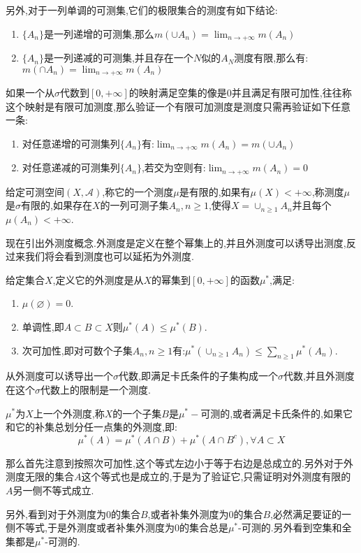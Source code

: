 另外,对于一列单调的可测集,它们的极限集合的测度有如下结论:
\begin{enumerate}
  \item $\{A_n\}$是一列递增的可测集,那么$m(\cup A_n)=\lim_{n\to +\infty}m(A_n)$
  \item $\{A_n\}$是一列递减的可测集,并且存在一个$N$似的$A_N$测度有限,那么有:
  $m(\cap A_n)=\lim_{n\to+\infty}m(A_n)$
\end{enumerate}

如果一个从$\sigma$代数到$[0,+\infty]$的映射满足空集的像是0并且满足有限可加性,往往称这个映射是有限可加测度,那么验证一个有限可加测度是测度只需再验证如下任意一条:
\begin{enumerate}
  \item 对任意递增的可测集列$\{A_n\}$有:$\lim_ {n\to+\infty}m(A_n)=m(\cup A_n)$
  \item 对任意递减的可测集列$\{A_n\}$,若交为空则有:$\lim_ {n\to+\infty}m(A_n)=0$
\end{enumerate}

给定可测空间$(X,\mathscr{A})$,称它的一个测度$\mu$是有限的,如果有$\mu(X)<+\infty$,称测度$\mu$是$\sigma$有限的,如果存在$X$的一列可测子集$A_n,n\ge1$,使得$X=\cup_{n\ge1}A_n$并且每个$\mu(A_n)<+\infty$.

现在引出外测度概念.外测度是定义在整个幂集上的,并且外测度可以诱导出测度,反过来我们将会看到测度也可以延拓为外测度.

给定集合$X$,定义它的外测度是从$X$的幂集到$[0,+\infty]$的函数$\mu^ {*}$,满足:
\begin{enumerate}
  \item $\mu(\varnothing)=0$.
  \item 单调性,即$A\subset B\subset X$则$\mu^*(A)\le\mu^*(B)$.
  \item 次可加性,即对可数个子集$A_n,n\ge1$有:$\mu^* (\cup_{n\ge1}A_n)\le\sum_{n\ge1}\mu^*(A_n)$.
\end{enumerate}

从外测度可以诱导出一个$\sigma$代数,即满足卡氏条件的子集构成一个$\sigma$代数,并且外测度在这个$\sigma$代数上的限制是一个测度.

$\mu^*$为$X$上一个外测度,称$X$的一个子集$B$是$\mu^{*}-$可测的,或者满足卡氏条件的,如果它和它的补集总划分任一点集的外测度,即:
$$\mu^*(A)=\mu^*(A\cap B)+\mu^*(A\cap B^c),\forall A\subset X$$

那么首先注意到按照次可加性,这个等式左边小于等于右边是总成立的.另外对于外测度无限的集合$A$这个等式也是成立的,于是为了验证它,只需证明对外测度有限的$A$另一侧不等式成立.

另外,看到对于外测度为0的集合$B$,或者补集外测度为0的集合$B$,必然满足要证的一侧不等式,于是外测度或者补集外测度为0的集合总是$\mu^*$-可测的.另外看到空集和全集都是$\mu^*$-可测的.

